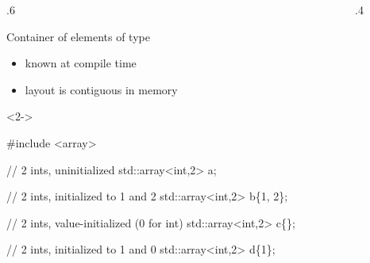 \begin{frame}[fragile]{}
  \begin{columns}
    \begin{column}{.6\textwidth}

  Container of  elements of type 
  \begin{itemize}
  \item {} known at compile time
  \item layout is contiguous in memory
  \end{itemize}

\begin{codeblock}<2->{
#include <array>

// 2 ints, uninitialized
std::array<int,2> a;

// 2 ints, initialized to 1 and 2
std::array<int,2> b\{1, 2\};

// 2 ints, value-initialized (0 for int)
std::array<int,2> c\{\};

// 2 ints, initialized to 1 and 0
std::array<int,2> d\{1\};

}\end{codeblock}

    \end{column}

    \begin{column}{.4\textwidth}


\end{column}
\end{columns}
\end{frame}
